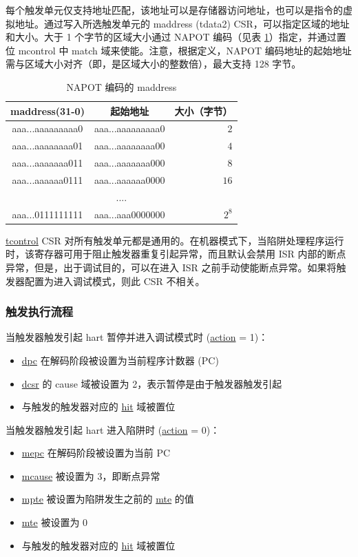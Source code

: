 \documentclass[main\_\_CN.tex]{subfiles}
\begin{document}
每个触发单元仅支持地址匹配，该地址可以是存储器访问地址，也可以是指令的虚拟地址。通过写入所选触发单元的 maddress (tdata2) CSR，可以指定区域的地址和大小。大于 1 个字节的区域大小通过 NAPOT 编码（见表 \ref{tab:riscvcpu-hwt-table}）指定，并通过置位 mcontrol 中 match 域来使能。注意，根据定义，NAPOT 编码地址的起始地址需与区域大小对齐（即，是区域大小的整数倍），最大支持 128 字节。

\begin{longtable}{ | c | c | r | }
\caption{NAPOT 编码的 maddress} \label{tab:riscvcpu-hwt-table}
\\ \hline
\rowcolor{lightgray}
maddress(31-0) & 起始地址 & 大小（字节） \\ \hline
aaa...aaaaaaaaa0 & aaa...aaaaaaaaa0 & $2$ \\ \hline
aaa...aaaaaaaa01 & aaa...aaaaaaaa00 & $4$ \\ \hline
aaa...aaaaaaa011 & aaa...aaaaaaa000 & $8$ \\ \hline
aaa...aaaaaa0111 & aaa...aaaaaa0000 & $16$ \\ \hline
\multicolumn{3}{c}{....} \\ \hline
aaa...0111111111 & aaa...aaa0000000 & $2^{8}$ \\ \hline
\end{longtable}

\hyperref[regdesc:TCONTROL]{tcontrol} CSR 对所有触发单元都是通用的。在机器模式下，当陷阱处理程序运行时，该寄存器可用于阻止触发器重复引起异常，而且默认会禁用 ISR 内部的断点异常，但是，出于调试目的，可以在进入 ISR 之前手动使能断点异常。如果将触发器配置为进入调试模式，则此 CSR 不相关。

\subsubsection{触发执行流程}
\label{sec:riscvcpu-hwt-suggest-op}

当触发器触发引起 hart 暂停并进入调试模式时 (\hyperref[fielddesc:MCONTROLACTION]{action} = 1)：
\begin{itemize}
    \item \hyperref[regdesc:DPC]{dpc} 在解码阶段被设置为当前程序计数器 (PC)
    \item \hyperref[regdesc:DCSR]{dcsr} 的 cause 域被设置为 2，表示暂停是由于触发器触发引起
    \item 与触发的触发器对应的 \hyperref[fielddesc:MCONTROLHIT]{hit} 域被置位
\end{itemize}

当触发器触发引起 hart 进入陷阱时 (\hyperref[fielddesc:MCONTROLACTION]{action} = 0)：
\begin{itemize}
    \item \hyperref[regdesc:MEPC]{mepc} 在解码阶段被设置为当前 PC
    \item \hyperref[regdesc:MCAUSE]{mcause} 被设置为 3，即断点异常
    \item \hyperref[fielddesc:TCONTROLMPTE]{mpte} 被设置为陷阱发生之前的 \hyperref[fielddesc:TCONTROLMTE]{mte} 的值
    \item \hyperref[fielddesc:TCONTROLMTE]{mte} 被设置为 0
    \item 与触发的触发器对应的 \hyperref[fielddesc:MCONTROLHIT]{hit} 域被置位
\end{itemize}
\end{document}
